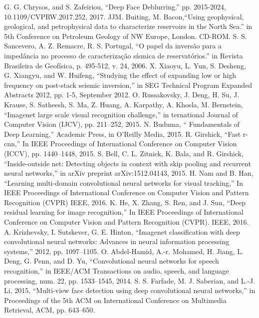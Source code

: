 \documentclass[conference]{IEEEtran}
\begin{document}
\begin{thebibliography}{00}
		G. G. Chrysos, and S. Zafeiriou, ``Deep Face Deblurring.'' pp. 2015-2024, 10.1109/CVPRW.2017.252, 2017. 
 		JJM. Buiting, M. Bacon,``Using geophysical, geological, and petrophysical data to characterize reservoirs in the North Sea.'' in 5th Conference on Petroleum Geology of NW Europe, London. CD-ROM.
		S. S. Sancevero, A. Z. Remacre, R. S. Portugal, ``O papel da inversão para a impedância no processo de caracterização sísmica de reservatórios.'' in Revista Brasileira de Geofísica, p. 495-512, v. 24, 2006.
  		X. Xiaoyu, L. Yun, S. Desheng, G. Xiangyu, and W. Huifeng, ``Studying the effect of expanding low or high frequency on post-stack seismic inversion,'' in SEG Technical Program Expanded Abstracts 2012, pp. 1-5, September 2012.
		O. Russakovsky, J. Deng, H. Su, J. Krause, S. Satheesh, S. Ma, Z. Huang, A. Karpathy, A. Khosla, M. Bernstein, ``Imagenet large scale visual recognition challenge,'' in ternational Journal of Computer Vision (IJCV), pp. 211–252, 2015.
  		N. Buduma, `` Fundamentals of Deep Learning,'' Academic Press, in O'Reilly Media, 2015.
		R. Girshick, ``Fast r-cnn,'' In IEEE Proceedings of International Conference on Computer Vision (ICCV), pp. 1440–1448, 2015.
		S. Bell, C. L. Zitnick, K. Bala, and R. Girshick, ``Inside-outside net: Detecting objects in context with skip pooling and recurrent neural networks,'' in arXiv preprint arXiv:1512.04143, 2015.
			H. Nam and B. Han, ``Learning multi-domain convolutional neural networks for visual tracking,'' In IEEE Proceedings of International Conference on Computer Vision and Pattern Recognition (CVPR) IEEE, 2016.
		K. He, X. Zhang, S. Ren, and J. Sun, ``Deep residual learning for image recognition,'' In IEEE Proceedings of International Conference on Computer Vision and Pattern Recognition (CVPR). IEEE, 2016.
	A. Krizhevsky, I. Sutskever, G. E. Hinton, ``Imagenet classification with deep convolutional neural networks: Advances in neural information processing systems,'' 2012, pp. 1097–1105.
	O. Abdel-Hamid, A.-r. Mohamed, H. Jiang, L. Deng, G. Penn, and D. Yu, ``Convolutional neural networks for speech recognition,'' in IEEE/ACM Transactions on audio, speech, and language processing, num. 22, pp. 1533–1545, 2014.
		S. S. Farfade, M. J. Saberian, and L.-J. Li, 2015, ``Multi-view face detection using deep convolutional neural networks,'' in Proceedings of the 5th ACM on International Conference on Multimedia Retrieval, ACM, pp. 643–650.

\end{thebibliography}
\end{document}
